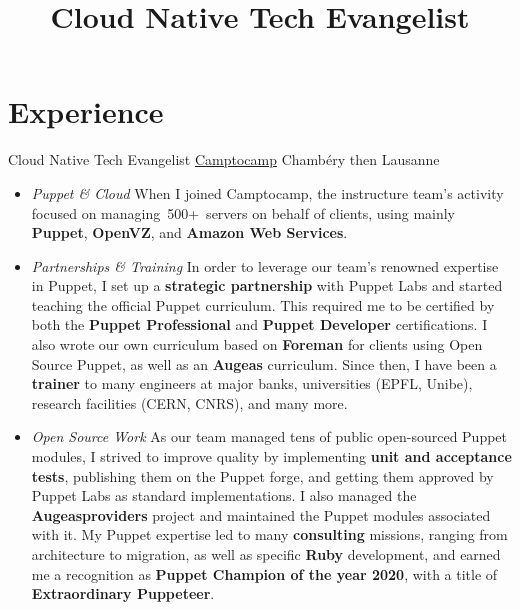 \documentclass[11pt,a4paper,nolmodern]{moderncv}
\title{Cloud Native Tech Evangelist}
\begin{document}
\setmainfont{Minion Pro}
\setsansfont{Myriad Pro}

\maketitle


\section{Experience}

          {Cloud Native Tech Evangelist}
          {\href{http://www.camptocamp.com}{Camptocamp}}
          {Chambéry then Lausanne}
          {}
          {
  \begin{itemize}
    \item \emph{Puppet \& Cloud}\newline
      When I joined Camptocamp, the instructure team's activity focused on
      managing 500+ servers on behalf of clients, using mainly \textbf{Puppet}, \textbf{OpenVZ}, and \textbf{Amazon Web Services}.
    \item \emph{Partnerships \& Training}\newline
      In order to leverage our team's renowned expertise in Puppet,
      I set up a \textbf{strategic partnership} with Puppet Labs and started teaching the official
      Puppet curriculum. This required me to be certified by both the \textbf{Puppet Professional} and \textbf{Puppet Developer} certifications.
      I also wrote our own curriculum based on \textbf{Foreman} for clients using Open Source Puppet, 
      as well as an \textbf{Augeas} curriculum.\newline
      Since then, I have been a \textbf{trainer} to many engineers at major banks, universities (EPFL, Unibe), research facilities (CERN, CNRS), and many more.
    \item \emph{Open Source Work}\newline
      As our team managed tens of public open-sourced Puppet modules, I strived to improve quality
      by implementing \textbf{unit and acceptance tests}, publishing them on the Puppet forge, and getting them approved by Puppet Labs as standard implementations. I also managed the \textbf{Augeasproviders} project and maintained the Puppet modules associated with it.
      My Puppet expertise led to many \textbf{consulting} missions, ranging from architecture to migration,
      as well as specific \textbf{Ruby} development, and earned me a recognition as \textbf{Puppet Champion of the year 2020}, with a title of \textbf{Extraordinary Puppeteer}.

\end{itemize}}
\end{document}
